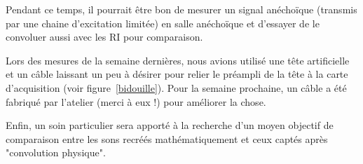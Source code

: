\documentclass[12pt]{article}
\begin{document}
Pendant ce temps, il pourrait être bon de mesurer un signal anéchoïque (transmis par une chaine d'excitation limitée) en
salle anéchoïque et d'essayer de le convoluer aussi avec les RI pour comparaison.

Lors des mesures de la semaine dernières, nous avions utilisé une tête artificielle et un câble laissant un peu à
désirer pour relier le préampli de la tête à la carte d'acquisition (voir figure~\ref{bidouille}). Pour la semaine
prochaine, un câble a été fabriqué par l'atelier (merci à eux !) pour améliorer la chose.

Enfin, un soin particulier sera apporté à la recherche d'un moyen objectif de comparaison entre les sons recréés
mathématiquement et ceux captés après "convolution physique".


\end{document}
